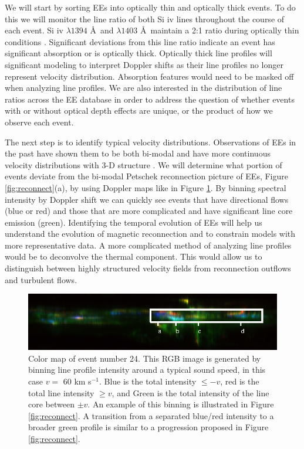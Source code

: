 \documentclass[]{aastex6}
\begin{document}
	We will start by sorting EEs into optically thin and optically thick events. To do this we will monitor the line ratio of both Si {\sc iv} lines throughout the course of each event.  Si {\sc iv} $\lambda 1394$ \AA \ and $\lambda 1403$ \AA \  maintain a 2:1 ratio during optically thin conditions  \citep{Mathioudakis1999}.  Significant deviations from this line ratio indicate an event has significant absorption or is optically thick.  Optically thick line profiles will significant modeling to interpret Doppler shifts as their line profiles no longer represent velocity distribution.  Absorption features would need to be masked off when analyzing line profiles. We are also interested in the distribution of line ratios across the EE database in order to address the question of whether events with or without optical depth effects are unique, or the product of how we observe each event.
	
	
	The next step is to identify typical velocity distributions.  Observations of EEs in the past have shown them to be both bi-modal \citep{Innes1997,Rust2017} and have more continuous velocity distributions with 3-D structure \citep{Fox2010,Innes2015,Rouppe2017}.  We will determine what portion of events deviate from the bi-modal Petschek reconnection picture of EEs,  Figure \ref{fig:reconnect}(a), by using Doppler maps like in Figure \ref{fig:eecolor}. By binning spectral intensity by Doppler shift we can quickly see events that have directional flows (blue or red) and those that are more complicated and have significant line core emission (green).  Identifying the temporal evolution of EEs will help us understand the evolution of magnetic reconnection and to constrain models with more representative data.  A more complicated method of analyzing line profiles would be to deconvolve the thermal component.  This would allow us to distinguish between highly structured velocity fields from reconnection outflows and turbulent flows.
	
	\begin{figure}
	
		\centerline{\includegraphics[scale=2]{NESSF_img/ee_color.eps}}
		\caption{Color map of event number 24. This RGB image is generated by binning line profile intensity around a typical sound speed, in this case $v = $ 60 km s$^{-1}$.  Blue is the total intensity  $\leq -v$, red is the total line intensity $\geq v$, and Green is the total intensity of the line core between $\pm v$. An example of this binning is illustrated in Figure \ref{fig:reconnect}.  A transition from a separated blue/red intensity to a broader green profile is similar to a progression proposed in Figure \ref{fig:reconnect}.}
		\label{fig:eecolor}
		
	\end{figure}
	
\end{document}
